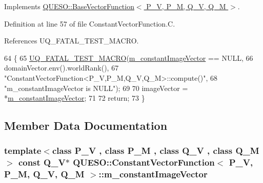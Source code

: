 Implements \hyperlink{class_q_u_e_s_o_1_1_base_vector_function_a7ecf6f9270dfd96812074c7ab4badd6e}{Q\-U\-E\-S\-O\-::\-Base\-Vector\-Function$<$ P\-\_\-\-V, P\-\_\-\-M, Q\-\_\-\-V, Q\-\_\-\-M $>$}.



Definition at line 57 of file Constant\-Vector\-Function.\-C.



References U\-Q\-\_\-\-F\-A\-T\-A\-L\-\_\-\-T\-E\-S\-T\-\_\-\-M\-A\-C\-R\-O.


\begin{DoxyCode}
64 \{
65   \hyperlink{_defines_8h_a56d63d18d0a6d45757de47fcc06f574d}{UQ\_FATAL\_TEST\_MACRO}(\hyperlink{class_q_u_e_s_o_1_1_constant_vector_function_a7d2befbf254e81916fc1e39ffaebd756}{m\_constantImageVector} == NULL,
66                       domainVector.env().worldRank(),
67                       \textcolor{stringliteral}{"ConstantVectorFunction<P\_V,P\_M,Q\_V,Q\_M>::compute()"},
68                       \textcolor{stringliteral}{"m\_constantImageVector is NULL"});
69 
70   imageVector = *\hyperlink{class_q_u_e_s_o_1_1_constant_vector_function_a7d2befbf254e81916fc1e39ffaebd756}{m\_constantImageVector};
71 
72   \textcolor{keywordflow}{return};
73 \}
\end{DoxyCode}


\subsection{Member Data Documentation}
\hypertarget{class_q_u_e_s_o_1_1_constant_vector_function_a7d2befbf254e81916fc1e39ffaebd756}{
\subsubsection[{m\-\_\-constant\-Image\-Vector}]{\setlength{\rightskip}{0pt plus 5cm}template$<$class P\-\_\-\-V , class P\-\_\-\-M , class Q\-\_\-\-V , class Q\-\_\-\-M $>$ const Q\-\_\-\-V$\ast$ {\bf Q\-U\-E\-S\-O\-::\-Constant\-Vector\-Function}$<$ P\-\_\-\-V, P\-\_\-\-M, Q\-\_\-\-V, Q\-\_\-\-M $>$\-::m\-\_\-constant\-Image\-Vector\hspace{0.3cm}{\ttfamily [protected]}}}\label{class_q_u_e_s_o_1_1_constant_vector_function_a7d2befbf254e81916fc1e39ffaebd756}


